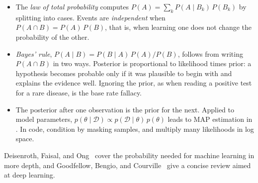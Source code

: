 \begin{itemize}
    $P(A \mid B) \ne P(B \mid A)$.
  \item The \emph{law of total probability} computes $P(A) = \sum_k P(A
    \mid B_k)\,P(B_k)$ by splitting into cases. Events are
    \emph{independent} when $P(A \cap B) = P(A)\,P(B)$, that is, when
    learning one does not change the probability of the other.
  \item \emph{Bayes' rule}, $P(A \mid B) = P(B \mid A)\,P(A)/P(B)$, follows
    from writing $P(A \cap B)$ in two ways. Posterior is proportional to
    likelihood times prior: a hypothesis becomes probable only if it was
    plausible to begin with and explains the evidence well. Ignoring the
    prior, as when reading a positive test for a rare disease, is the
    base rate fallacy.
  \item The posterior after one observation is the prior for the next.
    Applied to model parameters, $p(\theta \mid \mathcal{D}) \propto
    p(\mathcal{D} \mid \theta)\,p(\theta)$ leads to MAP estimation in
    . In code, condition by masking samples, and multiply
    many likelihoods in log space.
\end{itemize}

Deisenroth, Faisal, and Ong~\cite{deisenroth2020mml} cover the
probability needed for machine learning in more depth, and Goodfellow,
Bengio, and Courville~\cite{goodfellow2016deep} give a concise review
aimed at deep learning.
